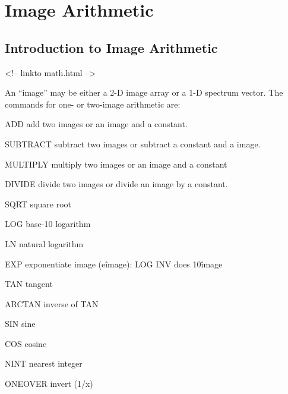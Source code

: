 \chapter{Image Arithmetic}

\section{Introduction to Image Arithmetic}
\begin{rawhtml}
<!-- linkto math.html -->
\end{rawhtml}

%
% 
%

An ``image'' may be either a 2-D image array or a 1-D spectrum vector.  The
commands for one- or two-image arithmetic are:

\begin{example}
  \item[ADD\hfill]{add two images or an image and a constant.}
  \item[SUBTRACT\hfill]{subtract two images or subtract a constant and a 
       image.}
  \item[MULTIPLY\hfill]{multiply two images or an image and a constant}
  \item[DIVIDE\hfill]{divide two images or divide an image by a constant.}
  \item[SQRT\hfill]{square root}
  \item[LOG\hfill]{base-10 logarithm}
  \item[LN\hfill]{natural logarithm}
  \item[EXP\hfill]{exponentiate image (e\^image):  LOG INV does 10\^image}
  \item[TAN\hfill]{tangent}
  \item[ARCTAN\hfill]{inverse of TAN}
  \item[SIN\hfill]{sine}
  \item[COS\hfill]{cosine}
  \item[NINT\hfill]{nearest integer}
  \item[ONEOVER\hfill]{invert (1/x)}
\end{example}

